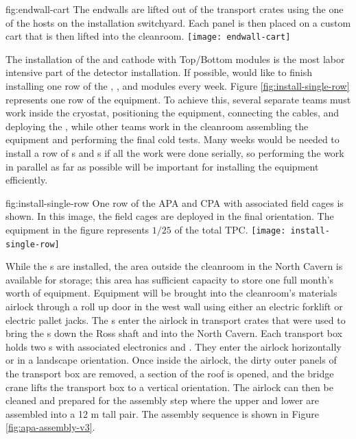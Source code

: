 \begin{dunefigure}{fig:endwall-cart}
  {The endwalls are lifted out of the transport crates using the one of the hosts on the installation switchyard. Each panel is then placed on a custom cart that is then lifted into the cleanroom.}
\texttt{[image: endwall-cart]}
\end{dunefigure}


The installation of the  and cathode with Top/Bottom  modules is the most labor intensive part of the detector installation. If possible,  would like to finish installing one row of the , , and  modules every week. Figure \ref{fig:install-single-row} represents one row of the equipment. To achieve this, several separate teams must work inside the cryostat, positioning the equipment, connecting the cables, and deploying the , while  other teams work in the cleanroom assembling the equipment and performing the final cold tests. Many weeks would be needed to install a row of s and s if all the work were done serially, so performing the work in parallel  as far as possible will be important for installing the equipment efficiently. 


\begin{dunefigure}{fig:install-single-row}
{One row of the APA and CPA with associated field cages is shown. In this  image, the field cages are deployed in the final orientation. The equipment in the figure represents $1/25$ of the total TPC.}
 \texttt{[image: install-single-row]}
\end{dunefigure}

While the s are installed, the area outside the cleanroom in the North Cavern is available for storage; this area has sufficient capacity to store one full month's worth of equipment. 
Equipment will be brought into the cleanroom's materials airlock through a roll up door in the west wall using either an electric forklift or electric pallet jacks.  
The s enter the airlock in transport crates that were used to bring the s down the Ross shaft and into the North Cavern. 
Each transport box holds two s with associated electronics and . They enter the airlock horizontally or in a landscape orientation. 
Once inside the airlock, the dirty outer panels of the transport box are removed, a section of the roof is opened, and the bridge crane lifts the transport box to a vertical orientation. 
The airlock can then be cleaned and prepared for the  assembly step where the upper and lower  are assembled into a 12 \si{m} tall pair.
The  assembly sequence is shown in Figure \ref{fig:apa-assembly-v3}.

